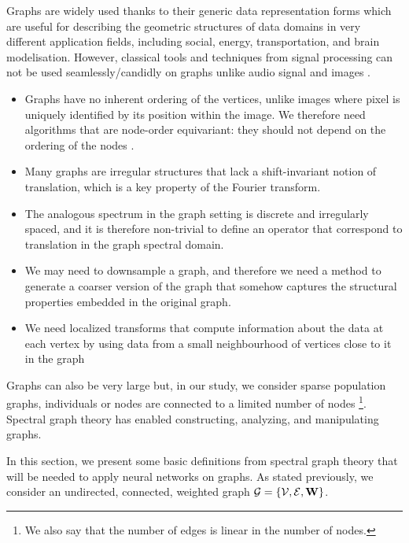 Graphs are widely used thanks to their generic data representation forms which are useful for describing the geometric structures of data domains in very different application fields, including social, energy, transportation, and brain modelisation.
However, classical tools and techniques from signal processing can not be used seamlessly/candidly on graphs unlike audio signal and images \cite{shuman_emerging_2013}.

\begin{itemize}
    \item Graphs have no inherent ordering of the vertices, unlike images where pixel is uniquely identified by its position within the image. We therefore need algorithms that are node-order equivariant: they should not depend on the ordering of the nodes \cite{daigavane_understanding_2021}.
    \item Many graphs are irregular structures that lack a shift-invariant notion of translation, which is a key property of the Fourier transform.
    \item The analogous spectrum in the graph setting is discrete and irregularly spaced, and it is therefore non-trivial to define an operator that correspond to translation in the graph spectral domain.
    \item We may need to downsample a graph, and therefore we need a method to generate a coarser version of the graph that somehow captures the structural properties embedded in the original graph.
    \item We need localized transforms that compute information about the data at each vertex by using data from a small neighbourhood of vertices close to it in the graph
\end{itemize}
Graphs can also be very large but, in our study, we consider sparse population graphs, \ie individuals or nodes are connected to a limited number of nodes \footnote{We also say that the number of edges is linear in the number of nodes.}.
Spectral graph theory has enabled constructing, analyzing, and manipulating graphs.


In this section, we present some basic definitions from spectral graph theory that will be needed to apply neural networks on graphs. As stated previously, we consider an undirected, connected, weighted graph $\mathcal{G} = \{\mathcal{V}, \mathcal{E}, \mathbf{W}\}$. 

